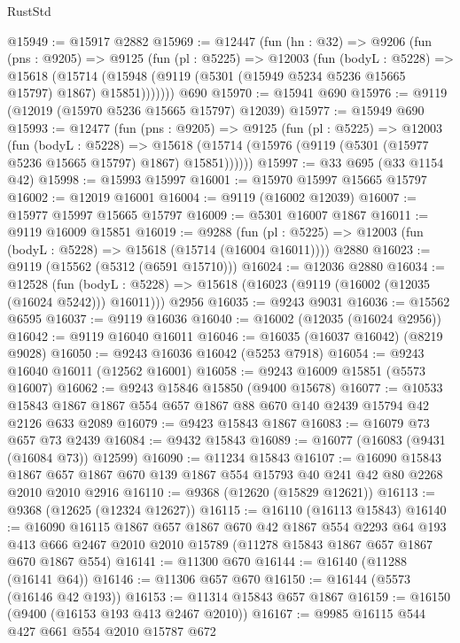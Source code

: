 \begin{lexlean}{RustStd}
\begin{coremodule}
@15949 := @15917 @2882
@15969 := @12447
    (fun (hn : @32) =>
    @9206
      (fun (pns : @9205) =>
      @9125
        (fun (pl : @5225) =>
        @12003
          (fun (bodyL : @5228) =>
          @15618
            (@15714 (@15948 (@9119 (@5301 (@15949 @5234 @5236 @15665 @15797) @1867) @15851)))))))
    @690
@15970 := @15941 @690
@15976 := @9119 (@12019 (@15970 @5236 @15665 @15797) @12039)
@15977 := @15949 @690
@15993 := @12477
    (fun (pns : @9205) =>
    @9125
      (fun (pl : @5225) =>
      @12003
        (fun (bodyL : @5228) =>
        @15618 (@15714 (@15976 (@9119 (@5301 (@15977 @5236 @15665 @15797) @1867) @15851))))))
@15997 := @33 @695 (@33 @1154 @42)
@15998 := @15993 @15997
@16001 := @15970 @15997 @15665 @15797
@16002 := @12019 @16001
@16004 := @9119 (@16002 @12039)
@16007 := @15977 @15997 @15665 @15797
@16009 := @5301 @16007 @1867
@16011 := @9119 @16009 @15851
@16019 := @9288
    (fun (pl : @5225) => @12003 (fun (bodyL : @5228) => @15618 (@15714 (@16004 @16011))))
    @2880
@16023 := @9119 (@15562 (@5312 (@6591 @15710)))
@16024 := @12036 @2880
@16034 := @12528
    (fun (bodyL : @5228) => @15618 (@16023 (@9119 (@16002 (@12035 (@16024 @5242))) @16011)))
    @2956
@16035 := @9243 @9031
@16036 := @15562 @6595
@16037 := @9119 @16036
@16040 := @16002 (@12035 (@16024 @2956))
@16042 := @9119 @16040 @16011
@16046 := @16035 (@16037 @16042) (@8219 @9028)
@16050 := @9243 @16036 @16042 (@5253 @7918)
@16054 := @9243 @16040 @16011 (@12562 @16001)
@16058 := @9243 @16009 @15851 (@5573 @16007)
@16062 := @9243 @15846 @15850 (@9400 @15678)
@16077 := @10533 @15843 @1867 @1867 @554 @657 @1867 @88 @670 @140 @2439 @15794 @42 @2126 @633 @2089
@16079 := @9423 @15843 @1867
@16083 := @16079 @73 @657 @73 @2439
@16084 := @9432 @15843
@16089 := @16077 (@16083 (@9431 (@16084 @73)) @12599)
@16090 := @11234 @15843
@16107 := @16090
    @15843
    @1867
    @657
    @1867
    @670
    @139
    @1867
    @554
    @15793
    @40
    @241
    @42
    @80
    @2268
    @2010
    @2010
    @2916
@16110 := @9368 (@12620 (@15829 @12621))
@16113 := @9368 (@12625 (@12324 @12627))
@16115 := @16110 (@16113 @15843)
@16140 := @16090
    @16115
    @1867
    @657
    @1867
    @670
    @42
    @1867
    @554
    @2293
    @64
    @193
    @413
    @666
    @2467
    @2010
    @2010
    @15789
    (@11278 @15843 @1867 @657 @1867 @670 @1867 @554)
@16141 := @11300 @670
@16144 := @16140 (@11288 (@16141 @64))
@16146 := @11306 @657 @670
@16150 := @16144 (@5573 (@16146 @42 @193))
@16153 := @11314 @15843 @657 @1867
@16159 := @16150 (@9400 (@16153 @193 @413 @2467 @2010))
@16167 := @9985 @16115 @544 @427 @661 @554 @2010 @15787 @672

\end{coremodule}
\end{lexlean}
